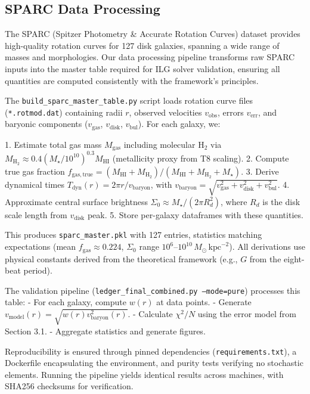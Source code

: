 \documentclass[12pt,a4paper]{article}
\begin{document}
\subsection{SPARC Data Processing}

The SPARC (Spitzer Photometry \& Accurate Rotation Curves) dataset provides high-quality rotation curves for 127 disk galaxies, spanning a wide range of masses and morphologies. Our data processing pipeline transforms raw SPARC inputs into the master table required for ILG solver validation, ensuring all quantities are computed consistently with the framework's principles.

The \texttt{build\_sparc\_master\_table.py} script loads rotation curve files (\texttt{*.rotmod.dat}) containing radii $r$, observed velocities $v_\mathrm{obs}$, errors $v_\mathrm{err}$, and baryonic components ($v_\mathrm{gas}$, $v_\mathrm{disk}$, $v_\mathrm{bul}$). For each galaxy, we:

1. Estimate total gas mass $M_\mathrm{gas}$ including molecular H$_2$ via $M_\mathrm{H_2} \approx 0.4 (M_\star / 10^{10})^{0.3} M_\mathrm{HI}$ (metallicity proxy from T8 scaling).
2. Compute true gas fraction $f_\mathrm{gas,true} = (M_\mathrm{HI} + M_\mathrm{H_2}) / (M_\mathrm{HI} + M_\mathrm{H_2} + M_\star)$.
3. Derive dynamical times $T_\mathrm{dyn}(r) = 2\pi r / v_\mathrm{baryon}$, with $v_\mathrm{baryon} = \sqrt{v_\mathrm{gas}^2 + v_\mathrm{disk}^2 + v_\mathrm{bul}^2}$.
4. Approximate central surface brightness $\Sigma_0 \approx M_\star / (2\pi R_d^2)$, where $R_d$ is the disk scale length from $v_\mathrm{disk}$ peak.
5. Store per-galaxy dataframes with these quantities.

This produces \texttt{sparc\_master.pkl} with 127 entries, statistics matching expectations (mean $f_\mathrm{gas} \approx 0.224$, $\Sigma_0$ range $10^6$--$10^{10}\,M_\odot\,\mathrm{kpc}^{-2}$). All derivations use physical constants derived from the theoretical framework (e.g., $G$ from the eight-beat period).

The validation pipeline (\texttt{ledger\_final\_combined.py --mode=pure}) processes this table:
- For each galaxy, compute $w(r)$ at data points.
- Generate $v_\mathrm{model}(r) = \sqrt{w(r) v_\mathrm{baryon}^2(r)}$.
- Calculate $\chi^2/N$ using the error model from Section 3.1.
- Aggregate statistics and generate figures.

Reproducibility is ensured through pinned dependencies (\texttt{requirements.txt}), a Dockerfile encapsulating the environment, and purity tests verifying no stochastic elements. Running the pipeline yields identical results across machines, with SHA256 checksums for verification.
\end{document}
